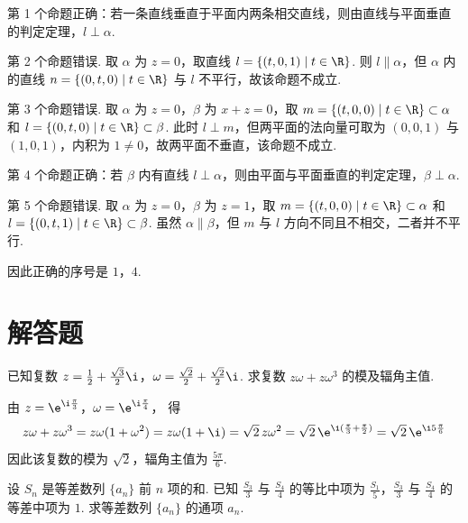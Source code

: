 \documentclass[UTF8,a4paper,oneside,11pt]{ctexbook}
\begin{document}
\begin{solution}
第 1 个命题正确：若一条直线垂直于平面内两条相交直线，则由直线与平面垂直的判定定理，\(l\perp\alpha\).

第 2 个命题错误. 取 \(\alpha\) 为 \(z=0\)，取直线 \(l=\{(t,0,1)\mid t\in\R\}\). 则 \(l\parallel\alpha\)，但 \(\alpha\) 内的直线 \(n=\{(0,t,0)\mid t\in\R\}\) 与 \(l\) 不平行，故该命题不成立.

第 3 个命题错误. 取 \(\alpha\) 为 \(z=0\)，\(\beta\) 为 \(x+z=0\)，取 \(m=\{(t,0,0)\mid t\in\R\}\subset\alpha\) 和 \(l=\{(0,t,0)\mid t\in\R\}\subset\beta\). 此时 \(l\perp m\)，但两平面的法向量可取为 \((0,0,1)\) 与 \((1,0,1)\)，内积为 \(1\ne0\)，故两平面不垂直，该命题不成立.

第 4 个命题正确：若 \(\beta\) 内有直线 \(l\perp\alpha\)，则由平面与平面垂直的判定定理，\(\beta\perp\alpha\).

第 5 个命题错误. 取 \(\alpha\) 为 \(z=0\)，\(\beta\) 为 \(z=1\)，取 \(m=\{(t,0,0)\mid t\in\R\}\subset\alpha\) 和 \(l=\{(0,t,1)\mid t\in\R\}\subset\beta\). 虽然 \(\alpha\parallel\beta\)，但 \(m\) 与 \(l\) 方向不同且不相交，二者并不平行.

因此正确的序号是 \(1\)，\(4\).
\end{solution}

\section{解答题}

\begin{problem}
已知复数 \(z = \frac{1}{2} + \frac{\sqrt{3}}{2}\i\)，\(\omega = \frac{\sqrt{2}}{2} + \frac{\sqrt{2}}{2}\i\). 求复数 \(z\omega + z\omega^3\) 的模及辐角主值.
\end{problem}

\begin{solution}
由 \(z=\e^{\i\frac{\pi}{3}}\)，\(\omega=\e^{\i\frac{\pi}{4}}\)，
得
\[
z\omega+z\omega^3
=z\omega(1+\omega^2)
=z\omega(1+\i)
=\sqrt2\,z\omega^2
=\sqrt2\,\e^{\i(\frac{\pi}{3}+\frac{\pi}{2})}
=\sqrt2\,\e^{\i5\frac{\pi}{6}}
\]
因此该复数的模为 \(\sqrt2\)，辐角主值为 \(\frac{5\pi}{6}\).
\end{solution}

\begin{problem}
设 \(S_{n}\) 是等差数列 \(\{a_{n}\}\) 前 \(n\) 项的和. 已知 \(\frac{S_{3}}{3}\) 与 \(\frac{S_{4}}{4}\) 的等比中项为 \(\frac{S_{1}}{5}\)，\(\frac{S_{3}}{3}\) 与 \(\frac{S_{4}}{4}\) 的等差中项为 \(1\). 求等差数列 \(\{a_{n}\}\) 的通项 \(a_{n}\).
\end{problem}
\end{document}
